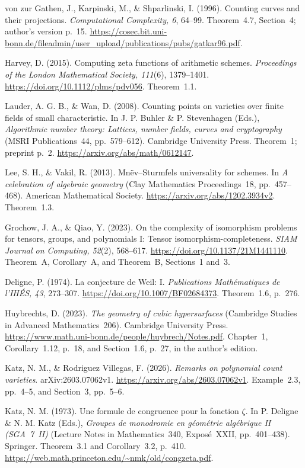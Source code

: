von zur Gathen, J., Karpinski, M., \& Shparlinski, I. (1996). Counting curves and their projections. \emph{Computational Complexity, 6}, 64--99. Theorem~4.7, Section~4; author's version p.~15. \url{https://cosec.bit.uni-bonn.de/fileadmin/user_upload/publications/pubs/gatkar96.pdf}.

Harvey, D. (2015). Computing zeta functions of arithmetic schemes. \emph{Proceedings of the London Mathematical Society, 111}(6), 1379--1401. \url{https://doi.org/10.1112/plms/pdv056}. Theorem~1.1.

Lauder, A. G. B., \& Wan, D. (2008). Counting points on varieties over finite fields of small characteristic. In J. P. Buhler \& P. Stevenhagen (Eds.), \emph{Algorithmic number theory: Lattices, number fields, curves and cryptography} (MSRI Publications~44, pp.~579--612). Cambridge University Press. Theorem~1; preprint p.~2. \url{https://arxiv.org/abs/math/0612147}.

Lee, S. H., \& Vakil, R. (2013). Mn\"ev--Sturmfels universality for schemes. In \emph{A celebration of algebraic geometry} (Clay Mathematics Proceedings~18, pp.~457--468). American Mathematical Society. \url{https://arxiv.org/abs/1202.3934v2}. Theorem~1.3.

Grochow, J. A., \& Qiao, Y. (2023). On the complexity of isomorphism problems for tensors, groups, and polynomials I: Tensor isomorphism-completeness. \emph{SIAM Journal on Computing, 52}(2), 568--617. \url{https://doi.org/10.1137/21M1441110}. Theorem~A, Corollary~A, and Theorem~B, Sections~1 and~3.

Deligne, P. (1974). La conjecture de Weil: I. \emph{Publications Math\'ematiques de l'IH\'ES, 43}, 273--307. \url{https://doi.org/10.1007/BF02684373}. Theorem~1.6, p.~276.

Huybrechts, D. (2023). \emph{The geometry of cubic hypersurfaces} (Cambridge Studies in Advanced Mathematics~206). Cambridge University Press. \url{https://www.math.uni-bonn.de/people/huybrech/Notes.pdf}. Chapter~1, Corollary~1.12, p.~18, and Section~1.6, p.~27, in the author's edition.

Katz, N. M., \& Rodriguez Villegas, F. (2026). \emph{Remarks on polynomial count varieties}. arXiv:2603.07062v1. \url{https://arxiv.org/abs/2603.07062v1}. Example~2.3, pp.~4--5, and Section~3, pp.~5--6.

Katz, N. M. (1973). Une formule de congruence pour la fonction $\zeta$. In P. Deligne \& N. M. Katz (Eds.), \emph{Groupes de monodromie en g\'eom\'etrie alg\'ebrique II (SGA~7~II)} (Lecture Notes in Mathematics~340, Expos\'e~XXII, pp.~401--438). Springer. Theorem~3.1 and Corollary~3.2, p.~410. \url{https://web.math.princeton.edu/~nmk/old/congzeta.pdf}.
